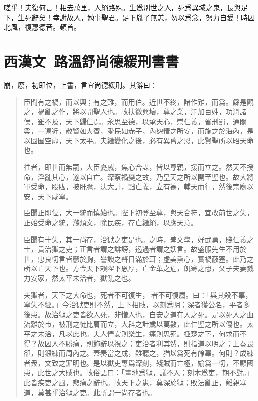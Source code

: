 嗟乎！夫復何言！相去萬里，人絕路殊。生爲別世之人，死爲異域之鬼，長與足下，生死辭矣！幸謝故人，勉事聖君。足下胤子無恙，勿以爲念，努力自愛！時因北風，復惠德音。頓首。 

\theendnotes

\section[路溫舒尚德緩刑書\quad{\small 西漢文}]{{\normalsize 西漢文\ 路溫舒}\quad 尚德緩刑書書}
崩，廢，初即位，上書，言宜尚德緩刑。其辭曰：

\begin{quotation}
臣聞有之禍，而以興；有之難，而用伯。近世不終，諸作難，而爲。繇是觀之，禍亂之作，將以開聖人也。故扶微興壞，尊之業，澤加百姓，功潤諸侯，雖不及，天下歸仁焉。永思至德，以承天心，崇仁義，省刑罰，通關梁，一遠近，敬賢如大賓，愛民如赤子，內恕情之所安，而施之於海內，是以囹圄空虛，天下太平。夫繼變化之後，必有異舊之恩，此賢聖所以昭天命也。

往者，即世而無嗣，大臣憂戚，焦心合謀，皆以尊親，援而立之。然天不授命，淫亂其心，遂以自亡。深察禍變之故，乃皇天之所以開至聖也。故大將軍受命，股肱，披肝膽，決大計，黜亡義，立有德，輔天而行，然後宗廟以安，天下咸寧。

臣聞正即位，大一統而慎始也。陛下初登至尊，與天合符，宜改前世之失，正始受命之統，滌煩文，除民疾，存亡繼絕，以應天意。

臣聞有十失，其一尚存，治獄之吏是也。之時，羞文學，好武勇，賤仁義之士，貴治獄之吏；正言者謂之誹謗，遏過者謂之妖言。故盛服先生不用於世，忠良切言皆鬱於胸，譽諛之聲日滿於耳；虛美熏心，實禍蔽塞。此乃之所以亡天下也。方今天下賴陛下恩厚，亡金革之危，飢寒之患，父子夫妻戮力安家，然太平未洽者，獄亂之也。

夫獄者，天下之大命也，死者不可復生，{\selectfont 𢇍}者不可復屬。曰：「與其殺不辜，寧失不經。」今治獄吏則不然，上下相敺，以刻爲明；深者獲公名，平者多後患。故治獄之吏皆欲人死，非憎人也，自安之道在人之死。是以死人之血流離於市，被刑之徒比肩而立，大辟之計歲以萬數，此仁聖之所以傷也。太平之未洽，凡以此也。夫人情安則樂生，痛則思死。棰楚之下，何求而不得？故囚人不勝痛，則飾辭以視之；吏治者利其然，則指道以明之；上奏畏卻，則鍛練而周內之。蓋奏當之成，雖聽之，猶以爲死有餘辜。何則？成練者衆，文致之罪明也。是以獄吏專爲深刻，殘賊而亡極，媮爲一切，不顧國患，此世之大賊也。故俗語曰：「畫地爲獄，議不入；刻木爲吏，期不對。」此皆疾吏之風，悲痛之辭也。故天下之患，莫深於獄；敗法亂正，離親塞道，莫甚乎治獄之吏。此所謂一尚存者也。


\end{quotation}
